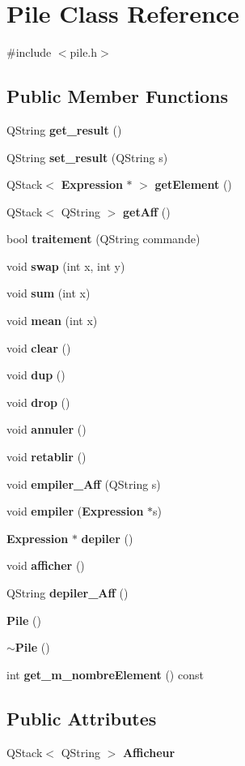 \section{Pile Class Reference}
\label{class_pile}


{\ttfamily \#include $<$pile.\-h$>$}

\subsection*{Public Member Functions}
\begin{DoxyCompactItemize}
\item 
Q\-String {\bf get\-\_\-result} ()
\item 
Q\-String {\bf set\-\_\-result} (Q\-String s)
\item 
Q\-Stack$<$ {\bf Expression} $\ast$ $>$ {\bf get\-Element} ()
\item 
Q\-Stack$<$ Q\-String $>$ {\bf get\-Aff} ()
\item 
bool {\bf traitement} (Q\-String commande)
\item 
void {\bf swap} (int x, int y)
\item 
void {\bf sum} (int x)
\item 
void {\bf mean} (int x)
\item 
void {\bf clear} ()
\item 
void {\bf dup} ()
\item 
void {\bf drop} ()
\item 
void {\bf annuler} ()
\item 
void {\bf retablir} ()
\item 
void {\bf empiler\-\_\-\-Aff} (Q\-String s)
\item 
void {\bf empiler} ({\bf Expression} $\ast$s)
\item 
{\bf Expression} $\ast$ {\bf depiler} ()
\item 
void {\bf afficher} ()
\item 
Q\-String {\bf depiler\-\_\-\-Aff} ()
\item 
{\bf Pile} ()
\item 
{\bf $\sim$\-Pile} ()
\item 
int {\bf get\-\_\-m\-\_\-nombre\-Element} () const 
\end{DoxyCompactItemize}
\subsection*{Public Attributes}
\begin{DoxyCompactItemize}
\item 
Q\-Stack$<$ Q\-String $>$ {\bf Afficheur}
\end{DoxyCompactItemize}


